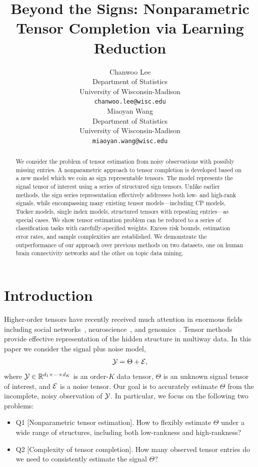\documentclass{article}
\title{Beyond the Signs: Nonparametric Tensor Completion via Learning Reduction}
\author{%
 Chanwoo Lee\\
  Department of Statistics\\
  University of Wisconsin-Madison\\
  \texttt{chanwoo.lee@wisc.edu} \\
   \And Miaoyan Wang \\
  Department of Statistics\\ 
   University of Wisconsin-Madison\\
   \texttt{miaoyan.wang@wisc.edu} \\
}
\theoremstyle{plain}
\theoremstyle{definition}
\begin{document}
\maketitle

\begin{abstract}
We consider the problem of tensor estimation from noisy observations with possibly missing entries. A nonparametric approach to tensor completion is developed based on a new model which we coin as sign representable tensors. The model represents the signal tensor of interest using a series of structured sign tensors. Unlike earlier methods, the sign series representation effectively addresses both low- and high-rank signals, while encompassing many existing tensor models---including CP models, Tucker models, single index models, structured tensors with repeating entries---as special cases. We show tensor estimation problem can be reduced to a series of classification tasks with carefully-specified weights. Excess risk bounds, estimation error rates, and sample complexities are established. We demonstrate the outperformance of our approach over previous methods on two datasets, one on human brain connectivity networks and the other on topic data mining. 
\end{abstract}

\section{Introduction}\label{sec:intro}

Higher-order tensors have recently received much attention in enormous fields including social networks~\citep{anandkumar2014tensor}, neuroscience~\citep{wang2017bayesian}, and genomics~\citep{hore2016tensor}. Tensor methods provide effective representation of the hidden structure in multiway data. In this paper we consider the signal plus noise model,
\begin{equation}\label{eq:modelintro}
\mathcal{Y}=\Theta+\mathcal{E},
\end{equation}
where $\mathcal{Y}\in\mathbb{R}^{d_1\times \cdots \times d_K}$ is an order-$K$ data tensor, $\Theta$ is an unknown signal tensor of interest, and $\mathcal{E}$ is a noise tensor. Our goal is to accurately estimate $\Theta$ from the incomplete, noisy observation of $\mathcal{Y}$. In particular, we focus on the following two problems:
\begin{itemize}[leftmargin=*,labelindent=-10pt]
\item[] Q1 [Nonparametric tensor estimation]. How to flexibly estimate $\Theta$ under a wide range of structures, including both low-rankness and high-rankness?
\item[] Q2 [Complexity of tensor completion]. How many observed tensor entries do we need to consistently estimate the signal $\Theta$?
\end{itemize}
\end{document}
